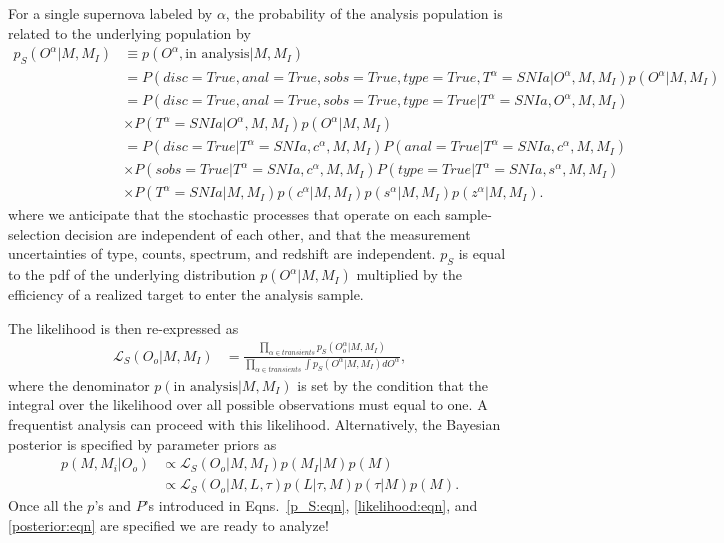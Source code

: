 \documentclass[preprint,3p]{elsarticle}
\begin{document}
For a single supernova labeled by $\alpha$,   the probability of the analysis population is related
to the underlying population by
\begin{align}
p_S(O^\alpha|M, M_I) &\equiv p(O^\alpha, \text{in analysis}|M, M_I) \nonumber \\
& = P(disc=True, anal=True, sobs=True, type=True, T^\alpha=SNIa|O^\alpha, M, M_I)p(O^\alpha|M, M_I) \nonumber \\
& = P(disc=True, anal=True, sobs=True, type=True|T^\alpha=SNIa, O^\alpha, M, M_I) \nonumber \\
& \times P(T^\alpha=SNIa| O^\alpha, M, M_I)p(O^\alpha|M, M_I) \nonumber \\
&= P(disc=True|T^\alpha=SNIa,c^\alpha, M, M_I)
P(anal=True|T^\alpha=SNIa,c^\alpha, M, M_I)  \nonumber \\
&  \times P(sobs=True|T^\alpha=SNIa,c^\alpha, M, M_I)
 P(type=True|T^\alpha=SNIa, s^\alpha, M, M_I) \nonumber \\
&  \times
P(T^\alpha=SNIa| M, M_I)p(c^\alpha|M, M_I)p(s^\alpha|M, M_I)p(z^\alpha|M, M_I).
\label{p_S:eqn}
\end{align}
where we anticipate that the stochastic processes that operate on each sample-selection decision
are independent of each other, and that the measurement uncertainties of type, counts,
spectrum, and redshift are independent.
$p_S$ is equal to the pdf of the underlying
distribution $p(O^\alpha|M, M_I)$ multiplied by the efficiency of a realized target to
enter the analysis sample.

The likelihood is then  re-expressed as
\begin{align}
\mathcal{L}_S(O_o | M, M_I) & = \frac{\prod_{\alpha \in transients}p_S(O_o^\alpha|M, M_I)}{\prod_{\alpha \in transients} \int  p_S(O^\alpha |M, M_I)dO^\alpha},
\label{likelihood:eqn}
\end{align}
where  the denominator $p(\text{in analysis}|M, M_I)$ is set
by the condition that the integral over the likelihood over all possible
observations must equal to one.
A frequentist analysis can proceed with this likelihood.
Alternatively, the Bayesian posterior is specified by parameter priors as 
\begin{align}
p(M, M_i | O_o) & \propto \mathcal{L}_S(O_o| M, M_I) p(M_I|M) p(M) \nonumber \\
 & \propto \mathcal{L}_S(O_o| M, L, \tau) p(L| \tau, M) p(\tau|M) p(M).
\label{posterior:eqn}
\end{align}
Once all the $p$'s and $P$'s introduced in
Eqns.~\ref{p_S:eqn}, \ref{likelihood:eqn}, and \ref{posterior:eqn}
are specified we are ready to analyze!
\end{document}
